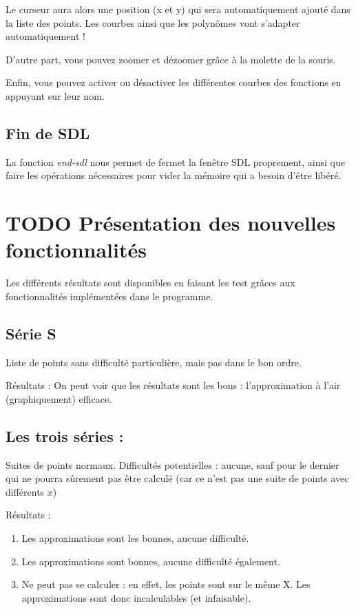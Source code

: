 \documentclass[letter]{article}
\begin{document}
Le curseur aura alors une position (x et y) qui sera automatiquement ajouté dans la liste des points. Les courbes ainsi que les polynômes vont s'adapter automatiquement !

D'autre part, vous pouvez zoomer et dézoomer grâce à la molette de la souris.

Enfin, vous pouvez activer ou désactiver les différentes courbes des fonctions en appuyant sur leur nom. 


\subsection{Fin de SDL}
\label{sec:org28196a5}

La fonction \emph{end-sdl} nous permet de fermet la fenêtre SDL proprement, ainsi que faire les opérations nécessaires pour vider la mémoire qui a besoin d'être libéré.


\section{{\bfseries\sffamily TODO} Présentation des nouvelles fonctionnalités}
\label{sec:org306c323}


Les différents résultats sont disponibles en faisant les test grâces aux fonctionnalités implémentées dans le programme.


\subsection{Série S}
\label{sec:orga6df84e}

Liste de points sans difficulté particulière, mais pas dans le bon ordre.

Résultats : On peut voir que les résultats sont les bons : l'approximation à l'air (graphiquement) efficace.



\subsection{Les trois séries :}
\label{sec:orgbdb02d0}

Suites de points normaux.
Difficultés potentielles : aucune, sauf pour le dernier qui ne pourra sûrement pas être calculé (car ce n'est pas une suite de points avec différents \(x\))


Résultats : 

\begin{enumerate}
\item Les approximations sont les bonnes, aucune difficulté.

\item Les approximations sont bonnes, aucune difficulté également.

\item Ne peut pas se calculer : en effet, les points sont sur le même X. Les approximations sont donc incalculables (et infaisable).
\end{enumerate}
\end{document}
